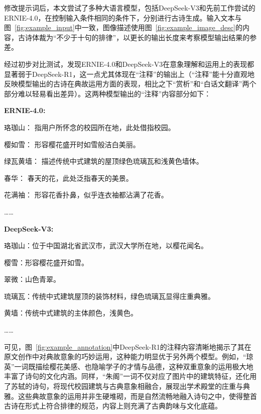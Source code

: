 修改提示词后，本文尝试了多种大语言模型，包括DeepSeek-V3和先前工作尝试的ERNIE-4.0，在控制输入条件相同的条件下，分别进行古诗生成。输入文本与图~\ref{fig:example_input}中一致，图像描述使用图~\ref{fig:example_image_desc}的内容，古诗体裁为“{\kaishu 不少于十句的排律}”，以更长的输出长度来考察模型输出结果的参差。

经过初步对比测试，发现ERNIE-4.0和DeepSeek-V3在意象理解和运用上的表现都显著弱于DeepSeek-R1，这一点尤其体现在“注释”的输出上（“注释”能十分直观地反映模型输出的古诗在典故运用方面的表现，相比之下“赏析”和“白话文翻译”两个部分难以轻易看出差异）。这两种模型输出的“注释”内容部分如下：

{\kaishu
\textbf{ERNIE-4.0:} \par 
珞珈山： 指用户所怀念的校园所在地，此处借指校园。\par 
樱如雪： 形容樱花盛开时如雪般洁白美丽。\par 
绿瓦黄墙： 描述传统中式建筑的屋顶绿色琉璃瓦和浅黄色墙体。\par 
春华： 春天的花，此处泛指春天的美景。\par 
花满袖： 形容花香扑鼻，似乎连衣袖都沾满了花香。\par 
…… \par
\textbf{DeepSeek-V3:} \par
珞珈山：位于中国湖北省武汉市，武汉大学所在地，以樱花闻名。\par
樱雪：形容樱花盛开如雪。\par
翠微：山色青翠。\par
琉璃瓦：传统中式建筑屋顶的装饰材料，绿色琉璃瓦显得庄重典雅。\par
黄墙：传统中式建筑的主体颜色，浅黄色。\par
……\par
}

可见，图~\ref{fig:example_annotation}中DeepSeek-R1的注释内容清晰地揭示了其在原文创作中对典故意象的巧妙运用，这种能力明显优于另外两个模型。例如，“琼英”一词既描绘樱花美感、也隐喻学子的才情与品德，这种双重意象的运用极大地丰富了诗句的文化内涵。同样，“朱阁”一词不仅对应了图片中的建筑特征，还化用了苏轼的诗句，将现代校园建筑与古典意象相融合，展现出学术殿堂的庄重与典雅。这些典故意象的运用并非生硬堆砌，而是自然流畅地融入诗句之中，使得整首古诗在形式上符合排律的规范，内容上则充满了古典韵味与文化底蕴。

